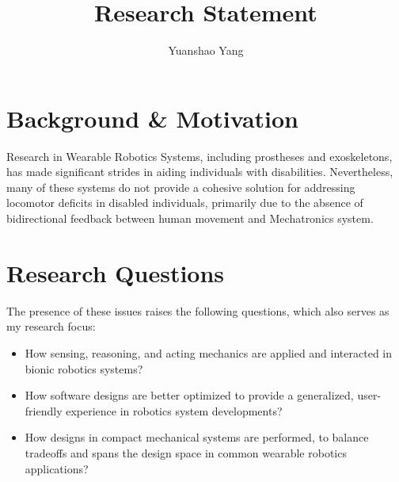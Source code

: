 \documentclass[8pt]{article}
\title{Research Statement}
\author{Yuanshao Yang}
\date{}
\begin{document}
\maketitle


\section{Background \& Motivation}


Research in Wearable Robotics Systems, including prostheses and exoskeletons, has made significant strides in aiding individuals with disabilities. Nevertheless, many of these systems do not provide a cohesive solution for addressing locomotor deficits in disabled individuals, primarily due to the absence of bidirectional feedback between human movement and Mechatronics system.


\section{Research Questions}


The presence of these issues raises the following questions, which also serves as my research focus: 

\begin{itemize}
            
    
    \item {How sensing, reasoning, and acting mechanics are applied and interacted in bionic robotics systems?}
    \item {How software designs are better optimized to provide a generalized, user-friendly experience in robotics system developments?}
    \item {How designs in compact mechanical systems are performed, to balance tradeoffs and spans the design space in common wearable robotics applications?}
    

\end{itemize}
\end{document}
